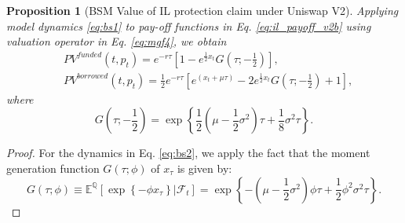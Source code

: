 \documentclass[pdftex,11pt,a4paper] {article}
\newtheorem{proposition}{Proposition}[section]
\begin{document}
\begin{proposition}[BSM Value of IL protection claim under Uniswap V2]
\label{prop:bs_v2} Applying model dynamics \eqref{eq:bs1} to pay-off
functions in Eq. \eqref{eq:il_payoff_v2b} using valuation operator in Eq. %
\eqref{eq:mgf4}, we obtain
\begin{equation}  \label{eq:il_payoff_v2bb}
\begin{split}
& PV^{funded}(t,p_{t}) = e^{-r \tau} \left[ 1 - e^{ \frac{1}{2} x_{t}} G
\left(\tau; -\frac{1}{2}\right) \right], \\
& PV^{borrowed}(t,p_{t}) = \frac{1}{2} e^{-r \tau} \left[ e^{(x_{t}
+\mu\tau)} - 2e^{ \frac{1}{2} x_{t}} G \left(\tau; -\frac{1}{2}\right) + 1%
\right],
\end{split}%
\end{equation}
where
\begin{equation}  \label{eq:bs2a}
G\left(\tau; -\frac{1}{2}\right) = \exp \left\{ \frac{1}{2} \left(\mu-\frac{1%
}{2}\sigma^{2}\right) \tau + \frac{1}{8} \sigma^2 \tau \right\}.
\end{equation}
\end{proposition}

\begin{proof}
For the dynamics in Eq. \eqref{eq:bs2}, we apply the fact that the moment generation function $G(\tau; \phi)$ of $x_{\tau}$ is given by:
\begin{equation} \label{eq:bs2gmf}
G(\tau; \phi) \equiv \mathbb{E}^{\mathbb{Q}}[\exp \left\{-\phi x_{\tau} \right\}\left.\right|\mathcal{F}_{t}] =  \exp \left\{-\left(\mu-\frac{1}{2}\sigma^{2}\right) \phi \tau + \frac{1}{2} \phi^2\sigma^2 \tau  \right\}.
\end{equation}
\end{proof}
\end{document}
